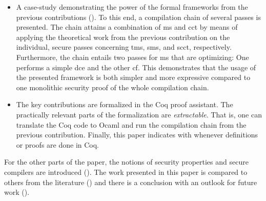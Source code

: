 \documentclass[acmsmall,review,screen,dvipsnames]{acmart}
\begin{document}
{\begin{itemize}
  \item %
        A case-study demonstrating the power of the formal frameworks from the previous contributions ().
        To this end, a compilation chain of several passes is presented.
        The chain attains a combination of \gls{ms} and \gls{cct} by means of applying the theoretical work from the previous contribution on the individual, secure passes concerning \gls{tms}, \gls{sms}, and \gls{scct}, respectively.
        Furthermore, the chain entails two passes for \gls{ms} that are optimizing: One performs a simple \gls{dce} and the other \gls{cf}.
        This demonstrates that the usage of the presented framework is both simpler and more expressive compared to one monolithic security proof of the whole compilation chain.

  \item The key contributions are formalized in the Coq proof assistant.
        The practically relevant parts of the formalization are \emph{extractable}.
        That is, one can translate the Coq code to Ocaml and run the compilation chain from the previous contribution.
        Finally, this paper indicates with \CoqSymbol whenever definitions or proofs are done in Coq.
\end{itemize}}

For the other parts of the paper, the notions of security properties and secure compilers are introduced ().
The work presented in this paper is compared to others from the literature () and there is a conclusion with an outlook for future work ().
\end{document}
